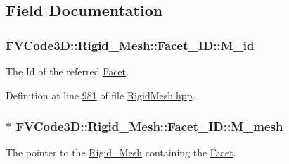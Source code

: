 \subsection{Field Documentation}
\subsubsection[{\texorpdfstring{M\+\_\+id}{M_id}}]{ F\+V\+Code3\+D\+::\+Rigid\+\_\+\+Mesh\+::\+Facet\+\_\+\+I\+D\+::\+M\+\_\+id\hspace{0.3cm}{\ttfamily [protected]}}\hypertarget{classFVCode3D_1_1Rigid__Mesh_1_1Facet__ID_ab8d2dc7ef7f4f606b92a76280b7ac946}{}\label{classFVCode3D_1_1Rigid__Mesh_1_1Facet__ID_ab8d2dc7ef7f4f606b92a76280b7ac946}


The Id of the referred \hyperlink{classFVCode3D_1_1Rigid__Mesh_1_1Facet}{Facet}. 



Definition at line \hyperlink{RigidMesh_8hpp_source_l00981}{981} of file \hyperlink{RigidMesh_8hpp_source}{Rigid\+Mesh.\+hpp}.

\subsubsection[{\texorpdfstring{M\+\_\+mesh}{M_mesh}}]{$\ast$ F\+V\+Code3\+D\+::\+Rigid\+\_\+\+Mesh\+::\+Facet\+\_\+\+I\+D\+::\+M\+\_\+mesh\hspace{0.3cm}{\ttfamily [protected]}}\hypertarget{classFVCode3D_1_1Rigid__Mesh_1_1Facet__ID_acd3810a3b4989320c21f7574354e7915}{}\label{classFVCode3D_1_1Rigid__Mesh_1_1Facet__ID_acd3810a3b4989320c21f7574354e7915}


The pointer to the \hyperlink{classFVCode3D_1_1Rigid__Mesh}{Rigid\+\_\+\+Mesh} containing the \hyperlink{classFVCode3D_1_1Rigid__Mesh_1_1Facet}{Facet}. 



